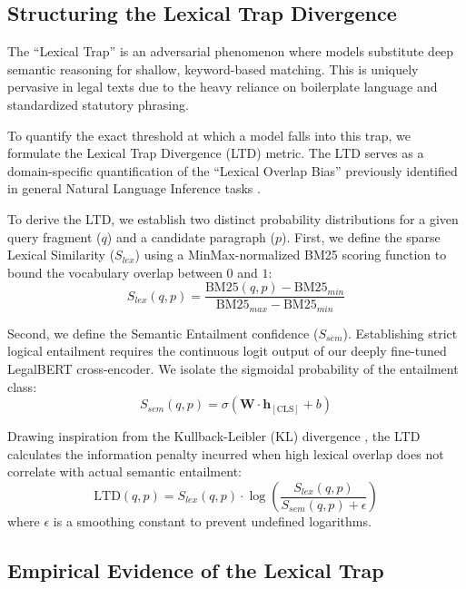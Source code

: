 \documentclass[sigconf]{acmart}
\begin{document}
\subsection{Structuring the Lexical Trap Divergence}

The ``Lexical Trap'' is an adversarial phenomenon where models substitute deep semantic reasoning for shallow, keyword-based matching. This is uniquely pervasive in legal texts due to the heavy reliance on boilerplate language and standardized statutory phrasing. 

To quantify the exact threshold at which a model falls into this trap, we formulate the Lexical Trap Divergence (LTD) metric. The LTD serves as a domain-specific quantification of the ``Lexical Overlap Bias'' previously identified in general Natural Language Inference tasks \cite{mccoy2019right}.

To derive the LTD, we establish two distinct probability distributions for a given query fragment ($q$) and a candidate paragraph ($p$). First, we define the sparse Lexical Similarity ($S_{lex}$) using a MinMax-normalized BM25 scoring function to bound the vocabulary overlap between $0$ and $1$:
\begin{equation}
    S_{lex}(q, p) = \frac{\text{BM25}(q, p) - \text{BM25}_{min}}{\text{BM25}_{max} - \text{BM25}_{min}}
\end{equation}

Second, we define the Semantic Entailment confidence ($S_{sem}$). Establishing strict logical entailment requires the continuous logit output of our deeply fine-tuned LegalBERT cross-encoder. We isolate the sigmoidal probability of the entailment class:
\begin{equation}
    S_{sem}(q, p) = \sigma(\mathbf{W} \cdot \mathbf{h}_{[\text{CLS}]} + b)
\end{equation}

Drawing inspiration from the Kullback-Leibler (KL) divergence \cite{kullback1951information}, the LTD calculates the information penalty incurred when high lexical overlap does not correlate with actual semantic entailment:
\begin{equation}
    \mathrm{LTD}(q, p) = S_{lex}(q, p) \cdot \log \left( \frac{S_{lex}(q, p)}{S_{sem}(q, p) + \epsilon} \right)
\end{equation}
where $\epsilon$ is a smoothing constant to prevent undefined logarithms.

\subsection{Empirical Evidence of the Lexical Trap}
\end{document}
